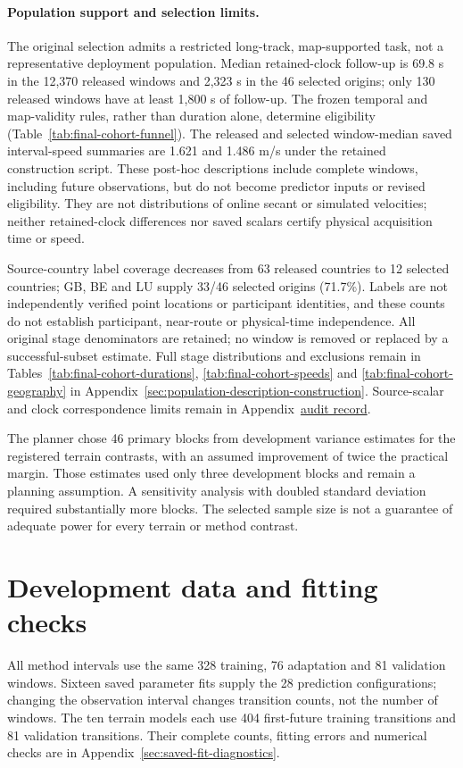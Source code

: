 \paragraph{Population support and selection limits.}\label{sec:population-support-summary}\hypertarget{sec:population-support-summary}{}
The original selection admits a restricted long-track, map-supported task,
not a representative deployment population. Median retained-clock follow-up
is 69.8 s in the 12,370 released windows and 2,323 s in the 46 selected
origins; only 130 released windows have at least 1,800 s of follow-up.
The frozen temporal and map-validity rules, rather than duration alone,
determine eligibility (Table~\ref{tab:final-cohort-funnel}).
The released and selected window-median saved interval-speed summaries
are 1.621 and 1.486 m/s under the retained construction script. These
post-hoc descriptions include complete windows, including future
observations, but do not become predictor inputs or revised eligibility.
They are not distributions of online secant or simulated velocities;
neither retained-clock differences nor saved scalars certify physical
acquisition time or speed.

Source-country label coverage decreases from 63 released countries to
12 selected countries; GB, BE and LU supply 33/46 selected origins (71.7\%).
Labels are not independently verified point locations or participant
identities, and these counts do not establish participant, near-route or
physical-time independence. All original stage denominators are retained;
no window is removed or replaced by a successful-subset estimate.
Full stage distributions and exclusions remain in
Tables~\ref{tab:final-cohort-durations}, \ref{tab:final-cohort-speeds} and
\ref{tab:final-cohort-geography} in
Appendix~\ref{sec:population-description-construction}. Source-scalar and
clock correspondence limits remain in
Appendix~\href{audit-notes.pdf\#sec:source-reconciliation-details}{audit record}.

The planner chose 46 primary blocks from development variance estimates for
the registered terrain contrasts, with an assumed improvement of twice the
practical margin. Those estimates used only three development blocks and
remain a planning assumption. A sensitivity analysis with doubled standard
deviation required substantially more blocks. The selected sample size is
not a guarantee of adequate power for every terrain or method contrast.


\section{Development data and fitting checks}
\label{sec:development-fit-summary}\hypertarget{sec:development-fit-summary}{}
All method intervals use the same 328 training, 76 adaptation and 81 validation
windows. Sixteen saved parameter fits supply the 28 prediction configurations;
changing the observation interval changes transition counts, not the number
of windows. The ten terrain models each use 404 first-future training
transitions and 81 validation transitions. Their complete counts, fitting
errors and numerical checks are in Appendix~\ref{sec:saved-fit-diagnostics}.


